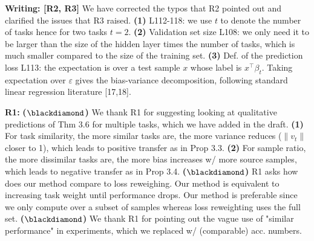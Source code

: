 \documentclass{article}
\begin{document}
\vspace{-0.025in}
\textbf{Writing: [R2, R3]}
We have corrected the typos that R2 pointed out and clarified the issues that R3 raised.
\textbf{(1)} L112-118: we use $t$ to denote the number of tasks hence for two tasks $t = 2$.
\textbf{(2)} Validation set size L108: we only need it to be larger than the size of the hidden layer times the number of tasks, which is much smaller compared to the size of the training set.
\textbf{(3)} Def. of the prediction loss L113: the expectation is over a test sample $x$ whose label is $x^{\top}\beta_t$.
Taking expectation over $\varepsilon$ gives  the bias-variance decomposition, following standard linear regression literature [17,18].

\vspace{-0.025in}
\textbf{R1:}
\textbf{($\blackdiamond$)} We thank R1 for suggesting looking at qualitative predictions of Thm 3.6 for multiple tasks, which we have added in the  draft.
\textbf{(1)} For task similarity, the more similar tasks are, the more variance reduces ($\|{v_t}\|$ closer to 1), which leads to positive transfer as in Prop 3.3.
\textbf{(2)} For sample ratio, the more dissimilar tasks are, the more bias increases w/ more source samples, which leads to negative transfer as in Prop 3.4.
\textbf{($\blackdiamond$)} R1 asks how does our method compare to loss reweighing.
Our method is equivalent to increasing task weight until performance drops.
Our method is preferable since we only compute over a subset of samples whereas loss reweighting uses the full set.
\textbf{($\blackdiamond$)} We thank R1 for pointing out the vague use of "similar performance" in experiments, which we replaced w/ (comparable) acc. numbers. %
\end{document}
